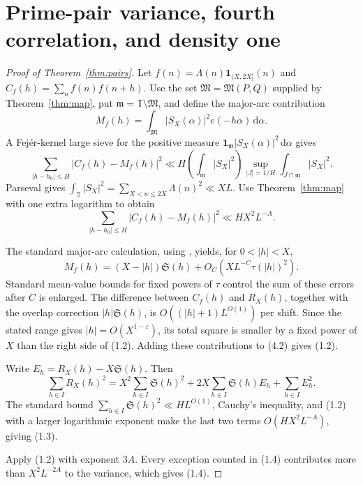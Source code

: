 \documentclass[11pt]{article}
\theoremstyle{remark}
\newcommand{\T}{\mathbb T}
\newcommand{\M}{\mathfrak M}
\newcommand{\m}{\mathfrak m}
\newcommand{\Sg}{\mathfrak S}
\newcommand{\eps}{\varepsilon}
\newcommand{\1}{\mathbf 1}
\newcommand{\dd}{\,\mathrm d}
\begin{document}
\section{Prime-pair variance, fourth correlation, and density one}
\begin{proof}[Proof of Theorem~\ref{thm:pairs}]
Let $f(n)=\Lambda(n)\1_{(X,2X]}(n)$ and
$C_f(h)=\sum_nf(n)f(n+h)$.  Use the set
\(\M=\M(P,Q)\) supplied by Theorem~\ref{thm:map}, put
\(\m=\T\setminus\M\), and define the major-arc contribution
\[
 M_f(h)=\int_{\M}|S_X(\alpha)|^2e(-h\alpha)\dd\alpha.
\]
A Fejér-kernel large sieve for the positive measure
$\1_{\m}|S_X(\alpha)|^2\dd\alpha$ gives
\[
 \sum_{|h-h_0|\le H}|C_f(h)-M_f(h)|^2
 \ll H\left(\int_{\m}|S_X|^2\right)
 \sup_{|J|=1/H}\int_{J\cap\m}|S_X|^2.                  \tag{4.1}
\]
Parseval gives $\int_\T|S_X|^2=\sum_{X<n\le2X}\Lambda(n)^2\ll XL$.
Use Theorem~\ref{thm:map} with one extra logarithm to obtain
\[
 \sum_{|h-h_0|\le H}|C_f(h)-M_f(h)|^2\ll HX^2L^{-A}.  \tag{4.2}
\]

The standard major-arc calculation, using
\cite[Proposition~4.1]{MRT2019}, yields, for $0<|h|<X$,
\[
 M_f(h)=(X-|h|)\Sg(h)+O_C(XL^{-C}\tau(|h|)^2).          \tag{4.3}
\]
Standard mean-value bounds for fixed powers of \(\tau\) control the sum of
these errors after $C$ is enlarged.  The difference between $C_f(h)$ and
$R_X(h)$, together with
the overlap correction $|h|\Sg(h)$, is
$O((|h|+1)L^{O(1)})$ per shift.  Since the stated range gives
$|h|=O(X^{1-\eps})$, its total square is smaller by a fixed power of \(X\)
than the right side of (1.2).  Adding these contributions to (4.2) gives
(1.2).

Write $E_h=R_X(h)-X\Sg(h)$.  Then
\[
 \sum_{h\in I}R_X(h)^2
 =X^2\sum_{h\in I}\Sg(h)^2
 +2X\sum_{h\in I}\Sg(h)E_h+\sum_{h\in I}E_h^2.        \tag{4.4}
\]
The standard bound $\sum_{h\in I}\Sg(h)^2\ll HL^{O(1)}$, Cauchy's inequality,
and (1.2) with a larger logarithmic exponent make the last two terms
$O(HX^2L^{-A})$, giving (1.3).

Apply (1.2) with exponent $3A$.  Every exception counted in (1.4)
contributes more than $X^2L^{-2A}$ to the variance, which gives (1.4).
\end{proof}
\end{document}
